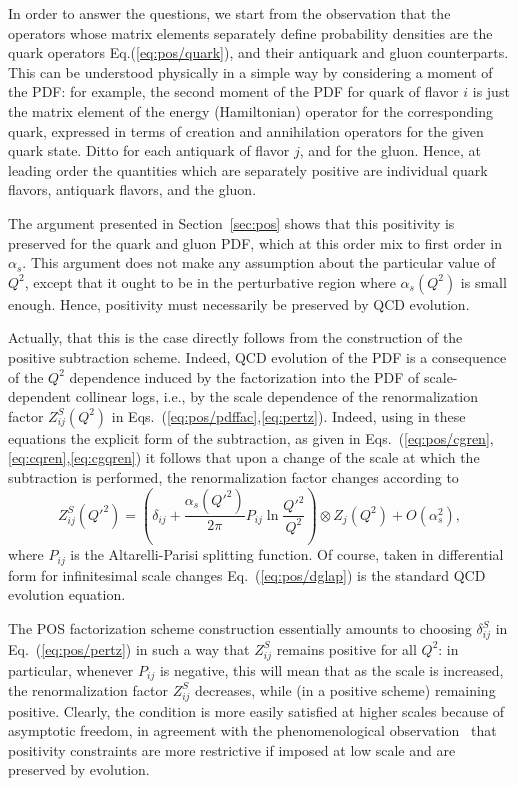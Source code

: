 In order to answer the questions, we start from the observation that
the operators whose matrix elements separately define probability densities are
the quark operators Eq.(\ref{eq:pos/quark}), and their antiquark and gluon
counterparts. This can be understood physically in a simple way by
considering a moment of the PDF: for example, the second moment of the
PDF for quark of flavor $i$ is just the matrix element of the energy
(Hamiltonian) operator for the corresponding quark, expressed in terms
of creation and annihilation operators for the given quark state.
Ditto for each antiquark of
flavor $j$, and for the gluon. Hence, at leading order the quantities
which are separately positive are individual quark flavors, antiquark
flavors, and the gluon.

The argument presented in Section~\ref{sec:pos} shows that this
positivity is preserved for the quark and gluon PDF, which at this
order mix to first order in $\alpha_s$. This argument does not make
any assumption about the particular value of $Q^2$, except that it
ought to be in the perturbative region where $\alpha_s(Q^2)$ is small
enough. Hence, positivity must necessarily be preserved by QCD
evolution.

Actually,  that this is the case directly follows from the construction of the
positive subtraction scheme.
Indeed, QCD evolution of the PDF is a consequence of the $Q^2$
dependence induced by the factorization into the PDF of
scale-dependent collinear logs, i.e., by the scale dependence of the
renormalization factor $Z^S_{ij}(Q^2)$ in
Eqs.~(\ref{eq:pos/pdffac},\ref{eq:pertz}). Indeed, using in these
equations
the explicit form
of the subtraction, as given in
Eqs.~(\ref{eq:pos/cgren},\ref{eq:cqren},\ref{eq:cgqren}) it follows that
upon a change of the scale at which the subtraction is performed, the
renormalization factor changes according to
\begin{equation}\label{eq:pos/dglap}
  Z^S_{ij}({Q'}^2)=\left(\delta_{ij}+\frac{\alpha_s({Q'}^2)}{2\pi}P_{ij}\ln\frac{{Q'}^2}{Q^2}\right)\otimes
  Z_j(Q^2) +O(\alpha_s^2),
\end{equation}
where $P_{ij}$ is the Altarelli-Parisi splitting function. Of course,
taken in differential form for infinitesimal scale changes
Eq.~(\ref{eq:pos/dglap}) is the standard QCD evolution equation.

The POS factorization scheme construction essentially amounts to
choosing $\delta^{S}_{ij}$ in Eq.~(\ref{eq:pos/pertz}) in  such a way that
$Z_{ij}^{S}$ remains positive for all $Q^2$: in particular, whenever
$P_{ij}$ is negative, this will mean that as the scale is increased,
the renormalization factor $Z_{ij}^S$ decreases, while (in a positive
scheme) remaining positive. Clearly, the condition is more easily
satisfied at higher scales because of asymptotic freedom, in agreement
with the phenomenological observation~\cite{Ball:2010de,Ball:2014uwa}
that positivity constraints are more restrictive if imposed at low
scale and are preserved by evolution.

